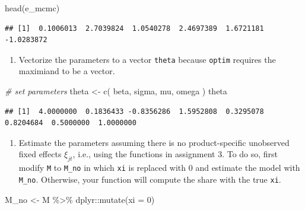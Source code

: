 \documentclass[
]{book}
\newenvironment{Shaded}{\begin{snugshade}}{\end{snugshade}}
\newcommand{\AttributeTok}[1]{\textcolor[rgb]{0.77,0.63,0.00}{#1}}
\newcommand{\CommentTok}[1]{\textcolor[rgb]{0.56,0.35,0.01}{\textit{#1}}}
\newcommand{\DecValTok}[1]{\textcolor[rgb]{0.00,0.00,0.81}{#1}}
\newcommand{\FunctionTok}[1]{\textcolor[rgb]{0.00,0.00,0.00}{#1}}
\newcommand{\NormalTok}[1]{#1}
\newcommand{\OtherTok}[1]{\textcolor[rgb]{0.56,0.35,0.01}{#1}}
\newcommand{\SpecialCharTok}[1]{\textcolor[rgb]{0.00,0.00,0.00}{#1}}
\providecommand{\tightlist}{%
  \setlength{\itemsep}{0pt}\setlength{\parskip}{0pt}}
\begin{document}
\begin{Shaded}
\begin{Highlighting}[]
\FunctionTok{head}\NormalTok{(e\_mcmc)}
\end{Highlighting}
\end{Shaded}

\begin{verbatim}
## [1]  0.1006013  2.7039824  1.0540278  2.4697389  1.6721181 -1.0283872
\end{verbatim}

\begin{enumerate}
\def\labelenumi{\arabic{enumi}.}
\setcounter{enumi}{1}
\tightlist
\item
  Vectorize the parameters to a vector \texttt{theta} because \texttt{optim} requires the maximiand to be a vector.
\end{enumerate}

\begin{Shaded}
\begin{Highlighting}[]
\CommentTok{\# set parameters}
\NormalTok{theta }\OtherTok{\textless{}{-}} 
  \FunctionTok{c}\NormalTok{(}
\NormalTok{    beta, }
\NormalTok{    sigma, }
\NormalTok{    mu, }
\NormalTok{    omega}
\NormalTok{    )}
\NormalTok{theta}
\end{Highlighting}
\end{Shaded}

\begin{verbatim}
## [1]  4.0000000  0.1836433 -0.8356286  1.5952808  0.3295078  0.8204684  0.5000000  1.0000000
\end{verbatim}

\begin{enumerate}
\def\labelenumi{\arabic{enumi}.}
\setcounter{enumi}{2}
\tightlist
\item
  Estimate the parameters assuming there is no product-specific unobserved fixed effects \(\xi_{jt}\), i.e., using the functions in assignment 3. To do so, first modify \texttt{M} to \texttt{M\_no} in which \texttt{xi} is replaced with 0 and estimate the model with \texttt{M\_no}. Otherwise, your function will compute the share with the true \texttt{xi}.
\end{enumerate}

\begin{Shaded}
\begin{Highlighting}[]
\NormalTok{M\_no }\OtherTok{\textless{}{-}} 
\NormalTok{  M }\SpecialCharTok{\%\textgreater{}\%}
\NormalTok{  dplyr}\SpecialCharTok{::}\FunctionTok{mutate}\NormalTok{(}\AttributeTok{xi =} \DecValTok{0}\NormalTok{)}
\end{Highlighting}
\end{Shaded}
\end{document}
